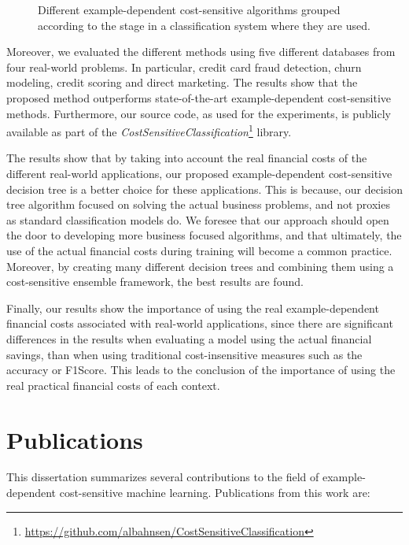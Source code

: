   \begin{figure}
  \centering
  
  \caption{Different example-dependent cost-sensitive algorithms grouped according to the 
    stage in a classification system where they are used.}
  \label{fig:1:1}
  \end{figure}
  
  Moreover, we evaluated the different methods using five different databases from four real-world 
  problems. In particular, credit card fraud detection, churn modeling, credit scoring and direct 
marketing. The results show that the proposed method outperforms state-of-the-art example-dependent  
  cost-sensitive methods. Furthermore, our source code, as used for the experiments, is publicly 
  available as part of the \textit{CostSensitiveClassification}\footnote{
  \url{https://github.com/albahnsen/CostSensitiveClassification}} library.
  
  The results show that by taking into account the real financial costs of the different 
  real-world applications, our  proposed example-dependent cost-sensitive decision tree is a better 
  choice for these applications. This is because, our decision tree algorithm focused on 
  solving the actual business problems,  and not proxies as standard classification models do. We 
  foresee that our approach should open the door to developing more business focused algorithms, 
  and  that ultimately, the use of the actual financial costs during training will become a common 
  practice. Moreover, by creating many different decision trees and combining them using a 
  cost-sensitive ensemble framework, the best results are found.

  Finally, our results show the importance of using the real example-dependent financial costs 
  associated with real-world applications, since there are significant differences in the 
  results when evaluating a model using the actual financial savings, than when using 
  traditional cost-insensitive measures such as the accuracy or F1Score. This leads to the 
  conclusion of the importance of using the real practical financial costs of each context.


\section{Publications}

This dissertation summarizes several contributions to the field of example-dependent 
cost-sensitive machine learning. Publications from this work are:
\bigskip

